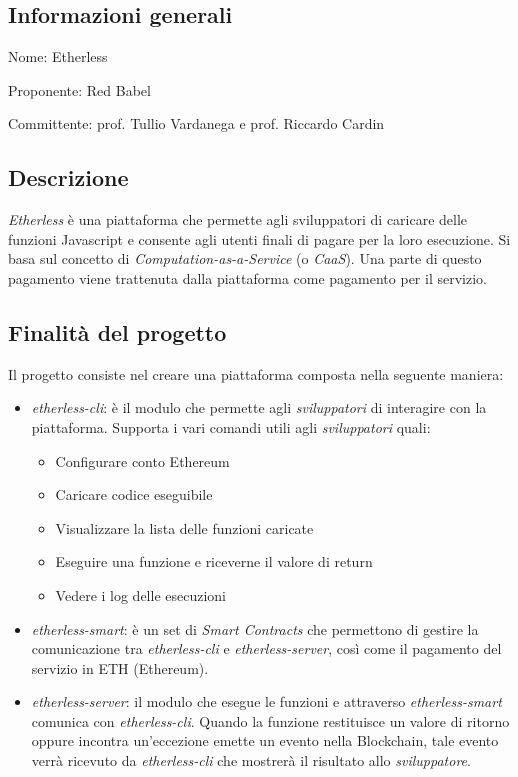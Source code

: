 \documentclass[../studio-di-fattibilita.tex]{subfiles}
\begin{document}
\subsection{Informazioni generali}%
\label{sub:informazioni_generale}
\begin{description}
  \item Nome: Etherless
  \item Proponente: Red Babel
  \item Committente: prof. Tullio Vardanega e prof. Riccardo Cardin
\end{description}

\subsection{Descrizione}%
\label{sub:descrizione}
\textit{Etherless} è una piattaforma  che permette agli sviluppatori di caricare delle funzioni Javascript e consente
agli utenti finali di pagare per la loro esecuzione. Si basa sul concetto di \textit{Computation-as-a-Service} (o \textit{CaaS}).
Una parte di questo pagamento viene trattenuta dalla piattaforma come pagamento per il servizio.

\subsection{Finalità del progetto}%
\label{sub:finalita_del_progetto}
Il progetto consiste nel creare una piattaforma  composta nella seguente maniera:
\begin{itemize}
  \item \textit{etherless-cli}: è il modulo che permette agli \textit{sviluppatori} di interagire con la piattaforma.
  Supporta i vari comandi utili agli \textit{sviluppatori} quali:
  \begin{itemize}
    \item Configurare conto Ethereum
    \item Caricare codice eseguibile
    \item Visualizzare la lista delle funzioni caricate
    \item Eseguire una funzione e riceverne il valore di return
    \item Vedere i log delle esecuzioni
  \end{itemize}
  \item \textit{etherless-smart}: è un set di \textit{Smart Contracts} che permettono di gestire la comunicazione tra 
        \textit{etherless-cli} e \textit{etherless-server}, così come il pagamento del servizio in ETH (Ethereum).
  \item \textit{etherless-server}: il modulo che esegue le funzioni e attraverso \textit{etherless-smart} comunica
        con \textit{etherless-cli}. Quando la funzione restituisce un valore di ritorno oppure incontra un'eccezione
        emette un evento nella Blockchain, tale evento verrà ricevuto da \textit{etherless-cli} che mostrerà il risultato
        allo \textit{sviluppatore}.
\end{itemize}
\end{document}

